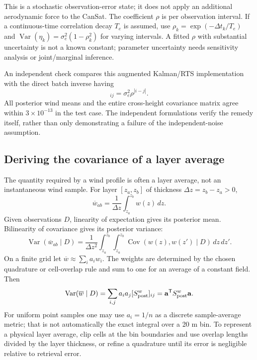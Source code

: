 \documentclass[11pt,a4paper]{article}
\numberwithin{equation}{section}
\newcommand{\Var}{\operatorname{Var}}
\newcommand{\Cov}{\operatorname{Cov}}
\begin{document}
This is a stochastic observation-error state; it does not apply an additional aerodynamic force to the CanSat. The coefficient $\rho$ is per observation interval. If a continuous-time correlation decay $T_e$ is assumed, use $\rho_k=\exp(-\Delta t_k/T_e)$ and $\Var(\eta_k)=\sigma_e^2(1-\rho_k^2)$ for varying intervals. A fitted $\rho$ with substantial uncertainty is not a known constant; parameter uncertainty needs sensitivity analysis or joint/marginal inference.

An independent check compares this augmented Kalman/RTS implementation with the direct batch inverse having
\begin{equation}
 [S_\varepsilon]_{ij}=\sigma_e^2\rho^{|i-j|}.
\end{equation}
All posterior wind means and the entire cross-height covariance matrix agree within $3\times10^{-13}$ in the test case. The independent formulations verify the remedy itself, rather than only demonstrating a failure of the independent-noise assumption.

\subsection{Deriving the covariance of a layer average}
The quantity required by a wind profile is often a layer average, not an instantaneous wind sample. For layer $[z_a,z_b]$ of thickness $\Delta z=z_b-z_a>0$,
\begin{equation}
 \overline w_{ab}=\frac1{\Delta z}\int_{z_a}^{z_b}w(z)\,dz.
\end{equation}
Given observations $D$, linearity of expectation gives its posterior mean. Bilinearity of covariance gives its posterior variance:
\begin{equation}
 \boxed{\Var(\overline w_{ab}\mid D)=\frac1{\Delta z^2}
 \int_{z_a}^{z_b}\int_{z_a}^{z_b}\Cov(w(z),w(z')\mid D)\,dz\,dz'.}
\end{equation}
On a finite grid let $\overline w\approx\sum_i a_iw_i$. The weights are determined by the chosen quadrature or cell-overlap rule and sum to one for an average of a constant field. Then
\begin{equation}
 \Var(\overline w\mid D)=\sum_{i,j}a_i a_j[S^w_{\rm post}]_{ij}
 =\mathbf a^{\mathsf T}S^w_{\rm post}\mathbf a.
\end{equation}
For uniform point samples one may use $a_i=1/n$ as a discrete sample-average metric; that is not automatically the exact integral over a 20 m bin. To represent a physical layer average, clip cells at the bin boundaries and use overlap lengths divided by the layer thickness, or refine a quadrature until its error is negligible relative to retrieval error.
\end{document}
